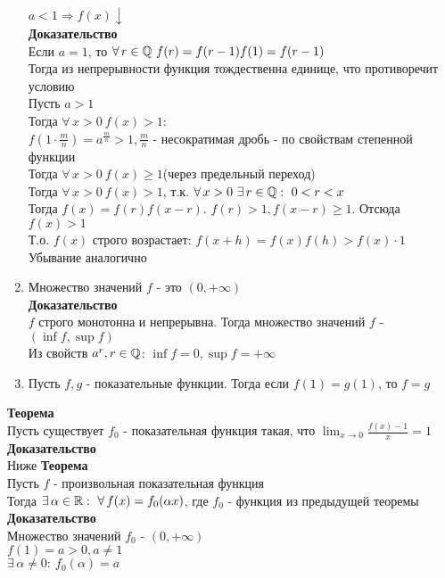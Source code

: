 \documentclass[12pt]{article}
\begin{document}
\begin{enumerate}
    $a < 1 \Rightarrow f(x) \downarrow$\\
    \textbf{Доказательство}\\
    Если $a = 1$, то $\forall\, r \in \mathbb{Q}\ f(r) = f(r-1)f(1) = f(r-1)$\\
    Тогда из непрерывности функция тождественна единице, что противоречит условию\\
    Пусть $a > 1$\\
    Тогда $\forall\,x>0\ f(x) > 1$:\\
    $f(1\cdot\frac mn) = a^\frac mn > 1, \frac mn$ - несократимая дробь - по свойствам степенной функции\\
    Тогда $\forall\,x>0\ f(x) \geq 1$(через предельный переход)\\
    Тогда $\forall\,x>0\ f(x) > 1$, т.к. $\forall\,x>0\ \exists\,r\in\mathbb{Q}:\ 0 < r < x$\\
    Тогда $f(x) = f(r)f(x-r)$. $f(r) > 1, f(x-r) \geq 1$. Отсюда $f(x) > 1$\\
    Т.о. $f(x)$ строго возрастает: $f(x+h)=f(x)f(h) > f(x)\cdot 1$\\
    Убывание аналогично
    \item Множество значений $f$ - это $(0, +\infty)$\\
    \textbf{Доказательство}\\
    $f$ строго монотонна и непрерывна. Тогда множество значений $f$ - $(\inf f, \sup f)$\\
    Из свойств $a^r, r \in \mathbb{Q}$: $\inf f = 0, \sup f = +\infty$
    \item Пусть $f, g$ - показательные функции. Тогда если $f(1) = g(1)$, то $f = g$
\end{enumerate}
\textbf{Теорема}\\
Пусть существует $f_0$ - показательная функция такая, что $\lim_{x\rightarrow 0} \frac{f(x)-1}{x} = 1$\\
\textbf{Доказательство}\\
Ниже
\textbf{Теорема}\\
Пусть $f$ - произвольная показательная функция\\
Тогда $\exists\,\alpha\in \bb{R}:\ \forall\,f(x)=f_0(\alpha x)$, где $f_0$ - функция из предыдущей теоремы\\
\textbf{Доказательство}\\
Множество значений $f_0$ - $(0, +\infty)$\\
$f(1) = a > 0, a \neq 1$\\
$\exists\,\alpha \neq 0:\ f_0(\alpha) = a$\\
\end{document}
